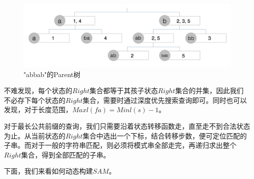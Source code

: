 ﻿\documentclass{sysuthesis}
\begin{document}
\begin{figure}[htbp]
	\centering
	\includegraphics[scale=0.3]{image/partree.png}
	\caption{"abbab"的Parent树}\label{imag_partree}
\end{figure}

不难发现，每个状态的$Right$集合都等于其孩子状态$Right$集合的并集，因此我们不必存下每个状态的$Right$集合，需要时通过深度优先搜索查询即可。同时也可以发现，对于长度范围，$Maxl(fa) = Minl(s) - 1$。\par
对于最长公共前缀的查询，我们只需要沿着状态转移函数走，直至走不到合法状态为止。从当前状态的$Right$集合中选出一个下标，结合转移步数，便可定位匹配的子串。而对于一般的字符串匹配，则必须将模式串全部走完，再递归求出整个$Right$集合，得到全部匹配的子串。\par
下面，我们来看如何动态构建$SAM$。
\end{document}
